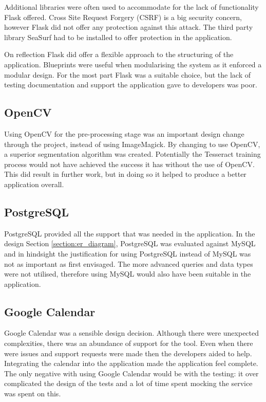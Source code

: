 Additional libraries were often used to accommodate for the lack of functionality Flask offered. Cross Site Request Forgery (CSRF) is a big security concern, however Flask did not offer any protection against this attack. The third party library SeaSurf \cite{citeulike:14025881} had to be installed to offer protection in the application.

On reflection Flask did offer a flexible approach to the structuring of the application. Blueprints were useful when modularising the system as it enforced a modular design. For the most part Flask was a suitable choice, but the lack of testing documentation and support the application gave to developers was poor.

\subsection{OpenCV}
Using OpenCV for the pre-processing stage was an important design change through the project, instead of using ImageMagick. By changing to use OpenCV, a superior segmentation algorithm was created. Potentially the Tesseract training process would not have achieved the success it has without the use of OpenCV. This did result in further work,  but in doing so it helped to produce a better application overall.

\subsection{PostgreSQL}
PostgreSQL provided all the support that was needed in the application. In the design Section \ref{section:er_diagram}, PostgreSQL was evaluated against MySQL and in hindsight the justification for using PostgreSQL instead of MySQL was not as important as first envisaged. The more advanced queries and data types were not utilised, therefore using MySQL would also have been suitable in the application.

\subsection{Google Calendar}
Google Calendar was a sensible design decision. Although there were unexpected complexities, there was an abundance of support for the tool. Even when there were issues and support requests were made then the developers aided to help. Integrating the calendar into the application made the application feel complete. The only negative with using Google Calendar would be with the testing: it over complicated the design of the tests and a lot of time spent mocking the service was spent on this.

